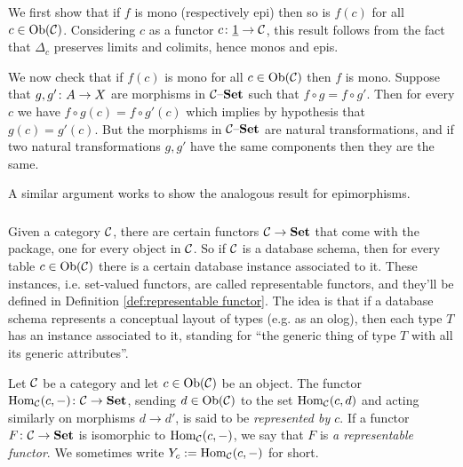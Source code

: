 \documentclass[CT4S-EN-RU]{subfiles}
\begin{document}
\begin{proofENG}
We first show that if $f$ is mono (respectively epi) then so is $f(c)$ for all $c\in\textnormal{Ob}(\mathcal{C})$. Considering $c$ as a functor $c\colon\underline{1}\rightarrow\mathcal{C}$, this result follows from the fact that $\Delta_c$ preserves limits and colimits, hence monos and epis. 

We now check that if $f(c)$ is mono for all $c\in\textnormal{Ob}(\mathcal{C})$ then $f$ is mono. Suppose that $g,g'\colon A\rightarrow X$ are morphisms in $\mathcal{C}{\text \textendash}{\bf Set}$ such that $f\circ g=f\circ g'$. Then for every $c$ we have $f\circ g(c)=f\circ g'(c)$ which implies by hypothesis that $g(c)=g'(c)$. But the morphisms in $\mathcal{C}{\text \textendash}{\bf Set}$ are natural transformations, and if two natural transformations $g,g'$ have the same components then they are the same. 

A similar argument works to show the analogous result for epimorphisms.
\end{proofENG}

\begin{proofRUS}
\end{proofRUS}


\subsubsection{}\label{sec:representable functors}

\begin{blockENG}
Given a category $\mathcal{C}$, there are certain functors $\mathcal{C}\rightarrow{\bf Set}$ that come with the package, one for every object in $\mathcal{C}$. So if $\mathcal{C}$ is a database schema, then for every table $c\in\textnormal{Ob}(\mathcal{C})$ there is a certain database instance associated to it. These instances, i.e. set-valued functors, are called representable functors, and they'll be defined in Definition \ref{def:representable functor}. The idea is that if a database schema represents a conceptual layout of types (e.g. as an olog), then each type $T$ has an instance associated to it, standing for “the generic thing of type $T$ with all its generic attributes”.
\end{blockENG}

\begin{blockRUS}
\end{blockRUS}

\begin{definitionENG}\label{def:representable functor}
Let $\mathcal{C}$ be a category and let $c\in\textnormal{Ob}(\mathcal{C})$ be an object. The functor $\textnormal{Hom}_\mathcal{C}(c,-)\colon\mathcal{C}\rightarrow{\bf Set}$, sending $d\in\textnormal{Ob}(\mathcal{C})$ to the set $\textnormal{Hom}_\mathcal{C}(c,d)$ and acting similarly on morphisms $d\to d'$, is said to be {\em represented by $c$}. If a functor $F\colon\mathcal{C}\rightarrow{\bf Set}$ is isomorphic to $\textnormal{Hom}_\mathcal{C}(c,-)$, we say that $F$ is {\em a representable functor}. We sometimes write $Y_c:=\textnormal{Hom}_\mathcal{C}(c,-)$ for short.
\end{definitionENG}
\end{document}
